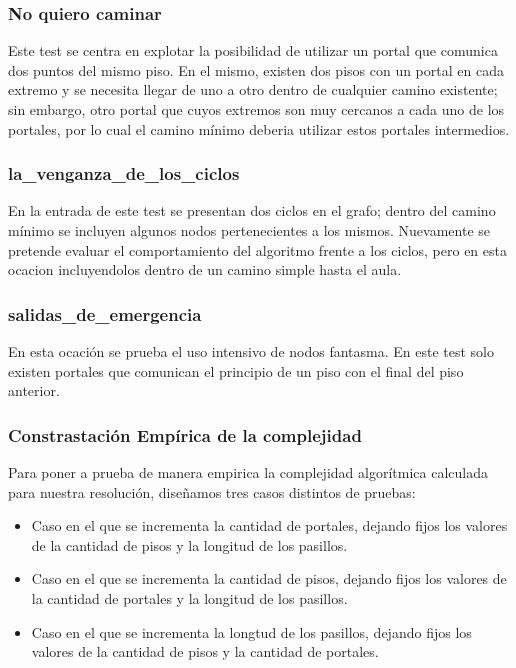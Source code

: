 \subsubsection{No quiero caminar}
Este test se centra en explotar la posibilidad de utilizar un portal que comunica dos puntos del mismo piso. En el mismo, existen dos pisos con un portal en cada extremo y se necesita llegar de uno a otro dentro de cualquier camino existente; sin embargo, otro portal que cuyos extremos son muy cercanos a cada uno de los portales, por lo cual el camino mínimo deberia utilizar estos portales intermedios.

\subsubsection{la_venganza_de_los_ciclos}
En la entrada de este test se presentan dos ciclos en el grafo; dentro del camino mínimo se incluyen algunos nodos pertenecientes a los mismos. Nuevamente se pretende evaluar el comportamiento del algoritmo frente a los ciclos, pero en esta ocacion incluyendolos dentro de un camino simple hasta el aula.

\subsubsection{salidas_de_emergencia}
En esta ocación se prueba el uso intensivo de nodos fantasma. En este test solo existen portales que comunican el principio de un piso con el final del piso anterior.

\subsubsection{Constrastación Empírica de la complejidad}
Para poner a prueba de manera empirica la complejidad algorítmica calculada para nuestra resolución, diseñamos tres casos distintos de pruebas:
\begin{itemize}
\item{Caso en el que se incrementa la cantidad de portales, dejando fijos los valores de la cantidad de pisos y la longitud de los pasillos.}
\item{Caso en el que se incrementa la cantidad de pisos, dejando fijos los valores de la cantidad de portales y la longitud de los pasillos.}
\item{Caso en el que se incrementa la longtud de los pasillos, dejando fijos los valores de la cantidad de pisos y la cantidad de portales.}
\end{itemize}

